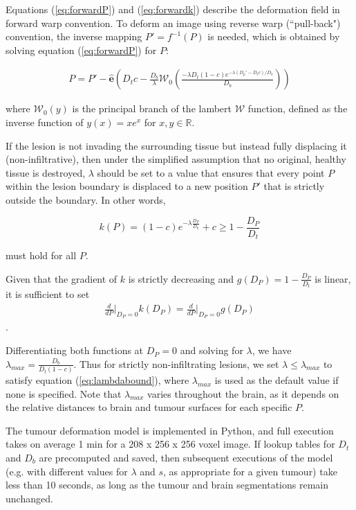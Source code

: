 Equations (\ref{eq:forwardP}) and (\ref{eq:forwardk}) describe the deformation field in forward warp convention. To deform an image using reverse warp (``pull-back") convention, the inverse mapping $P' = f^{-1}(P)$ is needed, which is obtained by solving equation (\ref{eq:forwardP}) for $P$:

\begin{align}
  P = P' - \mathbf{\hat{e}}(D_t c - \frac{D_b}{\lambda}\mathcal{W}_0(\frac{-\lambda D_t (1-c) e^{-\lambda(D_p'-D_tc)/D_b}}{D_b}))
\end{align}

where $\mathcal{W}_0(y)$ is the principal branch of the lambert $\mathcal{W}$ function, defined as the inverse function of $ y(x) = xe^x $ for $x,y \in \mathbb{R}$.

If the lesion is not invading the surrounding tissue but instead fully displacing it (non-infiltrative), then under the simplified assumption that no original, healthy tissue is destroyed, $\lambda$ should be set to a value that ensures that every point $P$ within the lesion boundary is displaced to a new position $P'$ that is strictly outside the boundary. In other words,

\begin{equation}\label{eq:lambdabound}
  k(P) = (1-c)e^{-\lambda \frac{D_P}{D_b}} +c \geq 1 - \frac{D_P}{D_t}
\end{equation}

must hold for all $P$.

Given that the gradient of $k$ is strictly decreasing and $g(D_P) = 1 - \frac{D_P}{D_t}$ is linear, it is sufficient to set
\begin{align}
  \frac{d}{dP}\bigg\rvert_{D_P=0}k(D_P) = \frac{d}{dP}\bigg\rvert_{D_P=0}g(D_P)
\end{align}.

Differentiating both functions at $D_P=0$ and solving for $\lambda$, we have $\lambda_{max} = \frac{D_b}{D_t (1-c)}$.
Thus for strictly non-infiltrating lesions, we set $\lambda \leq \lambda_{max}$ to satisfy equation (\ref{eq:lambdabound}), where $\lambda_{max}$ is used as the default value if none is specified. Note that $\lambda_{max}$ varies throughout the brain, as it depends on the relative distances to brain and tumour surfaces for each specific $P$.

The tumour deformation model is implemented in Python, and full execution takes on average 1 min for a 208 x 256 x 256 voxel image.
If lookup tables for $ D_t$ and $D_b$ are precomputed and saved, then subsequent executions of the model (e.g. with different values for $\lambda$ and $s$, as appropriate for a given tumour) take less than 10 seconds, as long as the tumour and brain segmentations remain unchanged.

